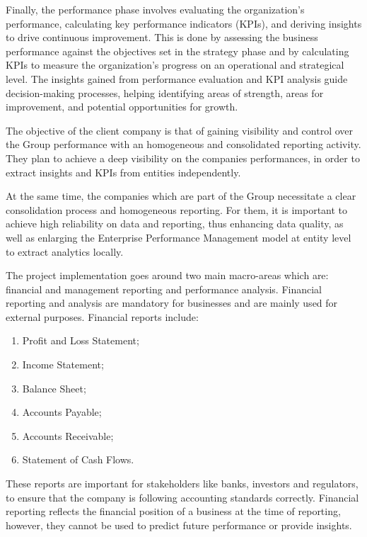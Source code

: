 \documentclass[12pt,a4paper,openright,twoside]{book}
\begin{document}
Finally, the performance phase involves evaluating the organization's performance, calculating key performance indicators (KPIs), and deriving insights to drive continuous improvement. 
%
This is done by assessing the business performance against the objectives set in the strategy phase and by calculating KPIs to measure the organization's progress on an operational and strategical level.
%
The insights gained from performance evaluation and KPI analysis guide decision-making processes, helping identifying areas of strength, areas for improvement, and potential opportunities for growth.

The objective of the client company is that of gaining visibility and control over the Group performance with an homogeneous and consolidated reporting activity.
%
They plan to achieve a deep visibility on the companies performances, in order to extract insights and KPIs from entities independently.

At the same time, the companies which are part of the Group necessitate a clear consolidation process and homogeneous reporting.
%
For them, it is important to achieve high reliability on data and reporting, thus enhancing data quality, as well as enlarging the Enterprise Performance Management model at entity level to extract analytics locally.

The project implementation goes around two main macro-areas which are: financial and management reporting and performance analysis.
%
Financial reporting and analysis are mandatory for businesses and are mainly used for external purposes.
%
Financial reports include:

\begin{enumerate}
    \item Profit and Loss Statement;
    \item Income Statement;
    \item Balance Sheet;
    \item Accounts Payable;
    \item Accounts Receivable;
    \item Statement of Cash Flows.
\end{enumerate}

These reports are important for stakeholders like banks, investors and regulators, to ensure that the company is following accounting standards correctly.
%
Financial reporting reflects the financial position of a business at the time of reporting, however, they cannot be used to predict future performance or provide insights.
\end{document}
